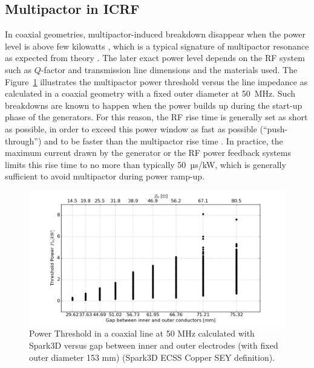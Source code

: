 \subsection{Multipactor in ICRF}\label{sec:multipactor_icrf}
In coaxial geometries, multipactor-induced breakdown disappear when the power level is above few kilowatts , which is a typical signature of multipactor resonance as expected from theory  . The later exact power level depends on the RF system such as $Q$-factor and transmission line dimensions and the materials used. The Figure~\ref{fig:powerthresholdcoax} illustrates the multipactor power threshold versus the line impedance as calculated in a coaxial geometry with a fixed outer diameter at 50~MHz. Such breakdowns are known to happen when the power builds up during the start-up phase of the generators. For this reason, the RF rise time is generally set as short as possible, in order to exceed this power window as fast as possible (“push-through”) and to be faster than the multipactor rise time . In practice, the maximum current drawn by the generator or the RF power feedback systems limits this rise time to no more than typically 50~µs/kW, which is generally sufficient to avoid multipactor during power ramp-up. 



\begin{figure}[h]
	\centering
	\includegraphics[width=1.0\linewidth]{figures/chap4/power_threshold_coax}
	\caption{Power Threshold in a coaxial line at 50 MHz calculated with Spark3D versus gap between inner and outer electrodes (with fixed outer diameter 153 mm) (Spark3D ECSS Copper SEY definition).}
	\label{fig:powerthresholdcoax}
\end{figure}



